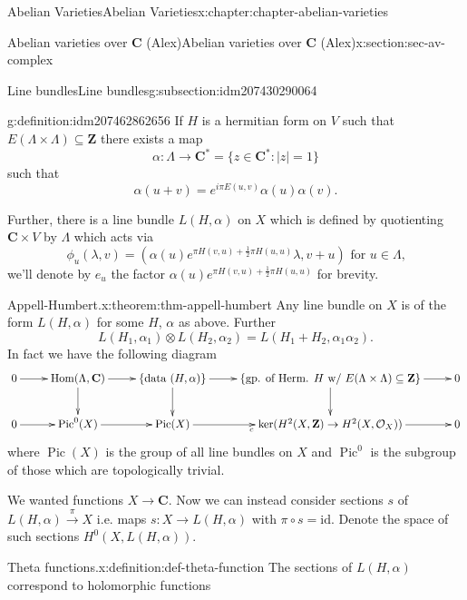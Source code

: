 \documentclass[oneside,10pt,]{book}
\numberwithin{equation}{section}
\newcommand{\sheaf}[1]{\operatorname{\mathcal{#1}}}
\newcommand{\ZZ}{\mathbf{Z}}
\newcommand{\CC}{\mathbf{C}}
\newcommand{\id}{\mathrm{id}}
\DeclareMathOperator{\Hom}{Hom}
\DeclareMathOperator{\Pic}{Pic}
\begin{document}
\begin{chapterptx}{Abelian Varieties}{}{Abelian Varieties}{}{}{x:chapter:chapter-abelian-varieties}
\begin{sectionptx}{Abelian varieties over \(\CC\) (Alex)}{}{Abelian varieties over \(\CC\) (Alex)}{}{}{x:section:sec-av-complex}
\begin{subsectionptx}{Line bundles}{}{Line bundles}{}{}{g:subsection:idm207430290064}
\begin{definition}{}{g:definition:idm207462862656}%
If \(H\) is a hermitian form on \(V\) such that \(E(\Lambda\times\Lambda) \subseteq \ZZ\) there exists a map%
\begin{equation*}
\alpha \colon \Lambda \to \CC^*  = \{z\in \CC^* : |z| = 1\}
\end{equation*}
such that%
\begin{equation*}
\alpha(u + v) = e^{i\pi E(u,v)} \alpha(u) \alpha(v)\text{.}
\end{equation*}
%
\par
Further, there is a line bundle \(L(H, \alpha)\) on \(X\) which is defined by quotienting \(\CC\times V\) by \(\Lambda\) which acts via%
\begin{equation*}
\phi_u(\lambda, v) = (\alpha(u)e^{\pi H(v,u) + \frac12 \pi H(u,u)}\lambda, v+u)\text{ for } u\in \Lambda\text{,}
\end{equation*}
we'll denote by \(e_u\) the factor \(\alpha(u)e^{\pi H(v,u) + \frac12 \pi H(u,u)}\) for brevity.%
\end{definition}
\begin{theorem}{Appell-Humbert.}{}{x:theorem:thm-appell-humbert}%
Any line bundle on \(X\) is of the form \(L(H,\alpha)\) for some \(H\), \(\alpha\) as above. Further%
\begin{equation*}
L(H_1, \alpha_1) \otimes L(H_2, \alpha_2)  = L(H_1+ H_2, \alpha_1\alpha_2)\text{.}
\end{equation*}
In fact we have the following diagram%
\begin{equation*}
\xymatrix{
0 \ar[r] &
\Hom(\Lambda, \CC) \ar[r]\ar[d] &
\{\text{data } (H,\alpha)\} \ar[r]\ar[d] &
\{\text{gp. of Herm. } H \text{ w/ }E(\Lambda\times \Lambda) \subseteq \ZZ\} \ar[r]\ar[d] &
0 \\
0 \ar[r] &
\Pic^0(X) \ar[r] &
\Pic(X) \ar[r]_c &
\ker(H^2(X,\ZZ) \to H^2(X,\sheaf O_X)) \ar[r]&
0
}
\end{equation*}
where \(\Pic(X)\) is the group of all line bundles on \(X\) and \(\Pic^0\) is the subgroup of those which are topologically trivial.%
\end{theorem}
We wanted functions \(X\to \CC\). Now we can instead consider sections \(s\) of \(L(H,\alpha) \xrightarrow{\pi} X\) i.e. maps \(s\colon X\to L(H,\alpha)\) with \(\pi\circ s = \id\). Denote the space of such sections \(H^0(X,L(H,\alpha))\).%
\begin{definition}{Theta functions.}{x:definition:def-theta-function}%
The sections of \(L(H, \alpha)\)  correspond to holomorphic functions%

\end{definition}
\end{subsectionptx}
\end{sectionptx}
\end{chapterptx}
\end{document}
